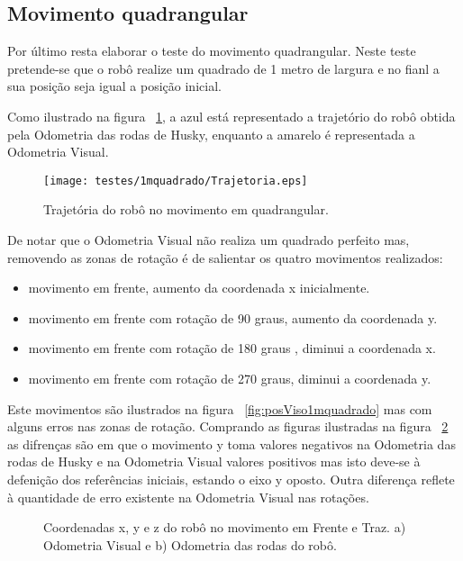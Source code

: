 \FloatBarrier
\subsection{Movimento quadrangular}\label{subsubsection:Quadrado}


Por último resta elaborar o teste do movimento quadrangular. Neste teste pretende-se que o robô realize um quadrado de 1 metro de largura e no fianl a sua posição seja igual a posição inicial.

Como ilustrado na figura ~\ref{fig:trajRobo1mquadrado}, a azul está representado a trajetório do robô obtida pela Odometria das rodas de Husky, enquanto a amarelo é representada a Odometria Visual. 


\begin{figure}[h!]
	\begin{center}
		\leavevmode		
		\texttt{[image: testes/1mquadrado/Trajetoria.eps]}
		\caption{Trajetória do robô no movimento em quadrangular.}
		\label{fig:trajRobo1mquadrado}
	\end{center}
\end{figure}


De notar que o Odometria Visual não realiza um quadrado perfeito mas, removendo as zonas de rotação é de salientar os quatro movimentos realizados:
\begin{itemize}
 	\item movimento em frente, aumento da coordenada x inicialmente.
 	\item movimento em frente com rotação de 90 graus, aumento da coordenada y.
 	\item movimento em frente com rotação de 180 graus , diminui a coordenada x.
 	\item movimento em frente com rotação de 270 graus, diminui a coordenada y.
\end{itemize}

Este movimentos são ilustrados na figura ~\ref{fig:posViso1mquadrado} mas com alguns erros nas zonas de rotação. Comprando as figuras ilustradas na figura ~\ref{fig:pos1mquadrado} as difrenças são em que o movimento y toma valores negativos na Odometria das rodas de Husky e na Odometria Visual valores positivos mas isto deve-se à defenição dos referências iniciais, estando o eixo y oposto. Outra diferença reflete à quantidade de erro existente na Odometria Visual nas rotações.


\begin{figure}[h!]
	\centering
	\qquad
	\caption{Coordenadas x, y e z do robô  no movimento em Frente e Traz. a) Odometria Visual e b) Odometria das rodas do robô.}
	\label{fig:pos1mquadrado}
\end{figure}


